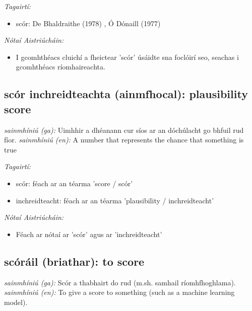 \documentclass{article}
\begin{document}
 \noindent \textit{Tagairtí:}
\begin{itemize}
	\item scór: De Bhaldraithe (1978) \cite{de-bhaldraithe}, Ó Dónaill (1977) \cite{odonaill}
\end{itemize}

 \noindent \textit{Nótaí Aistriúcháin:}
\begin{itemize}
	\item I gcomhthéacs cluichí a fheictear 'scór' úsáidte sna foclóirí seo, seachas i gcomhthéacs ríomhaireachta.
\end{itemize}


\subsection*{scór inchreidteachta (ainmfhocal): plausibility score} 
 \noindent \textit{sainmhíniú (ga):} Uimhhir a dhéanann cur síos ar an dóchúlacht go bhfuil rud fíor.
\newline\newline
 \noindent \textit{sainmhíniú (en):} A number that represents the chance that something is true
\newline

 \noindent \textit{Tagairtí:}
\begin{itemize}
	\item scór: féach ar an téarma 'score / scór'
	\item inchreidteacht: féach ar an téarma 'plausibility / inchreidteacht'
\end{itemize}

 \noindent \textit{Nótaí Aistriúcháin:}
\begin{itemize}
	\item Féach ar nótaí ar 'scór' agus ar 'inchreidteacht'
\end{itemize}


\subsection*{scóráil (briathar): to score} 
 \noindent \textit{sainmhíniú (ga):} Scór a thabhairt do rud (m.sh. samhail ríomhfhoghlama).
\newline\newline
 \noindent \textit{sainmhíniú (en):} To give a score to something (such as a machine learning model).
\newline
\end{document}
